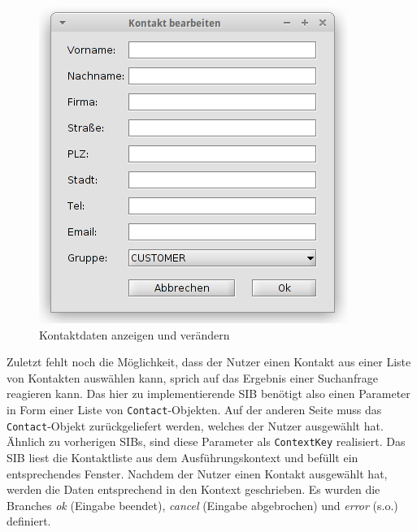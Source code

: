 \begin{figure}[h!t]
\includegraphics[width=\textwidth]{Bilder/Sib_EditContact_Frame.png}
\caption{Kontaktdaten anzeigen und verändern}
\label{fig:sibedit}
\end{figure}

Zuletzt fehlt noch die Möglichkeit, dass der Nutzer einen Kontakt aus einer Liste von Kontakten auswählen kann,
 sprich auf das Ergebnis einer Suchanfrage reagieren kann.
Das hier zu implementierende SIB benötigt also einen Parameter in Form einer Liste von \lstinline{Contact}-Objekten.
Auf der anderen Seite muss das \lstinline{Contact}-Objekt zurückgeliefert werden, welches der Nutzer ausgewählt hat.
Ähnlich zu vorherigen SIBs, sind diese Parameter als \lstinline{ContextKey} realisiert.
Das SIB liest die Kontaktliste aus dem Ausführungskontext und befüllt ein entsprechendes Fenster.
Nachdem der Nutzer einen Kontakt ausgewählt hat, werden die Daten entsprechend in den Kontext geschrieben.
Es wurden die Branches \emph{ok} (Eingabe beendet), \emph{cancel} (Eingabe abgebrochen) und \emph{error} (s.o.) definiert.

